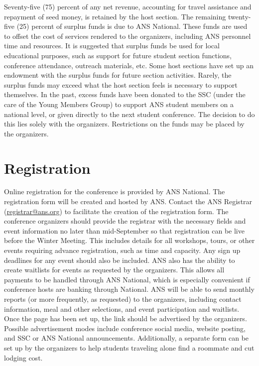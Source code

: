 \documentclass[12pt]{article}
\begin{document}
Seventy-five (75) percent of any net revenue, accounting for travel assistance and repayment of seed money, is retained by the host section.
The remaining twenty-five (25) percent of surplus funds is due to ANS National.
These funds are used to offset the cost of services rendered to the organizers,
including ANS personnel time and resources.
It is suggested that surplus funds be used for local educational purposes, such as support for future student section functions, conference attendance, outreach materials, etc.
Some host sections have set up an endowment with the surplus funds for future section activities.
Rarely, the surplus funds may exceed what the host section feels is necessary to support themselves.
In the past, excess funds have been donated to the SSC (under the care of the Young Members Group) to support ANS student members on a national level, or given directly to the next student conference.
The decision to do this lies solely with the organizers.
Restrictions on the funds may be placed by the organizers.

\clearpage
\section{Registration}
Online registration for the conference is provided by ANS National.
The registration form will be created and hosted by ANS.
Contact the ANS Registrar (\href{mailto:registrar@ans.org}{registrar@ans.org}) to facilitate the creation of the registration form.
The conference organizers should provide the registrar with the necessary fields and event information no later than mid-September so that registration can be live before the Winter Meeting.
This includes details for all workshops, tours, or other events requiring advance registration, such as time and capacity.
Any sign up deadlines for any event should also be included.
ANS also has the ability to create waitlists for events as requested by the organizers.
This allows all payments to be handled through ANS National, which is especially convenient if conference hosts are banking through National.
ANS will be able to send monthly reports (or more frequently, as requested) to the organizers, including contact information, meal and other selections, and event participation and waitlists.
Once the page has been set up, the link should be advertised by the organizers.
Possible advertisement modes include conference social media, website posting, and SSC or ANS National announcements.
Additionally, a separate form can be set up by the organizers to help students traveling alone find a roommate and cut lodging cost.
\end{document}
